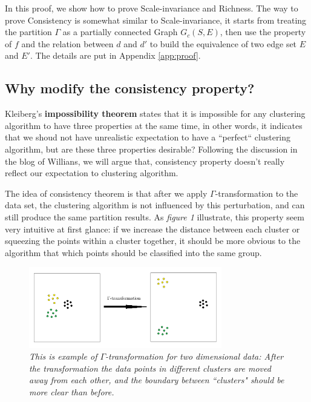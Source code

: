 \documentclass{uonmathreport}
\begin{document}
In this proof, we show how to prove Scale-invariance and Richness. The way to prove Consistency is somewhat similar to Scale-invariance, it starts from treating the partition $\Gamma$ as a partially connected Graph $G_c(S,E)$, then use the property of $f$ and the relation between $d$ and $d'$ to build the equivalence of two edge set $E$ and $E'$. The details are put in Appendix \ref{app:proof}.


\subsection{Why modify the consistency property?} \label{subsec: motivation for modifying consistency}
Kleiberg's \textbf{impossibility theorem} states that it is impossible for any clustering algorithm to have three properties at the same time, in other words, it indicates that we shoud not have unrealistic expectation to have a ``perfect“ clustering algorithm, but are these three properties desirable? Following the discussion in the blog of Willians\cite{williams_2015}, we will argue that, consistency property doesn't really reflect our expectation to clustering algorithm.

The idea of consistency theorem is that after we apply $\Gamma$-transformation to the data set, the clustering algorithm is not influenced by this perturbation, and can still produce the same partition results. As \textit{figure 1} illustrate, this property seem very intuitive at first glance: if we increase the distance between each cluster or squeezing the points within a cluster together, it should be more obvious to the algorithm that which points should be classified into the same group.
\begin{figure}[H]
 \begin{center}
   \includegraphics[width=0.75\textwidth]{Paper_figure_1.png}
 \end{center}
 \caption{\textit{This is example of $\Gamma$-transformation for two dimensional data: After the transformation the data points in different clusters are moved away from each other, and the boundary between ``clusters" should be more clear than before.}}
 \label{fig:bsd}
\end{figure}
\end{document}
